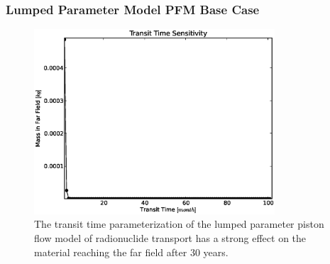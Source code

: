 \begin{frame}[ctb!]
\frametitle{Lumped Parameter Model PFM Base Case}
\begin{figure}[ht]
\centering
\includegraphics[width=0.8\textwidth]{./images/lpPFM_t_t.eps}
\caption[Lumped Parameter Piston Flow Model Transit Time Sensitivity]{The transit time 
parameterization of the lumped parameter piston flow model of radionuclide 
transport has a strong effect on the material reaching the far field after 30 
years.  }
\label{fig:lp_t_t_end}
\end{figure}
\end{frame}
